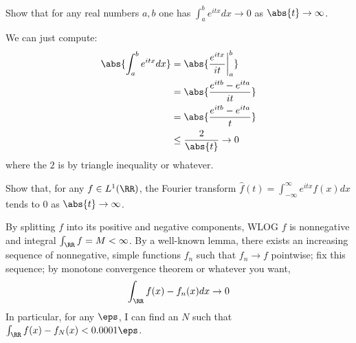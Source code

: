 \documentclass[11pt, headheight=30pt]{scrartcl}
\begin{document}
\section{}
\begin{prob}
    Show that for any real numbers $a, b$ one has
    $\int_a^b e^{itx} dx \to 0$ as $\abs{t} \to \infty$.
\end{prob}

We can just compute:
\begin{align*}
    \abs{\int_a^b e^{itx} dx} &= \abs{\frac{e^{itx}}{it} \bigg|_a^b} \\
    &= \abs{\frac{e^{itb} - e^{ita}}{it}} \\
    &= \abs{\frac{e^{itb} - e^{ita}}{t}} \\
    &\leq \frac{2}{\abs{t}} \to 0
\end{align*}
where the $2$ is by triangle inequality or whatever.

\begin{prob}
    Show that, for any $f \in L^1(\RR)$, the Fourier
    transform $\hat{f}(t) = \int_{-\infty}^\infty e^{itx} f(x) dx$
    tends to $0$ as $\abs{t} \to \infty$.
\end{prob}
By splitting $f$ into its positive and negative components, WLOG $f$
is nonnegative and integral $\int_\RR f = M < \infty$.
By a well-known lemma, there exists an increasing
sequence of nonnegative, simple functions $f_n$ such that $f_n \to f$ pointwise;
fix this sequence; by monotone convergence theorem
or whatever you want,
\[
    \int_\RR f(x) - f_n(x) dx\to 0    
\]
In particular, for any $\eps$, I can find an $N$
such that $\int_\RR f(x) - f_N(x) < 0.0001\eps$.
\end{document}
